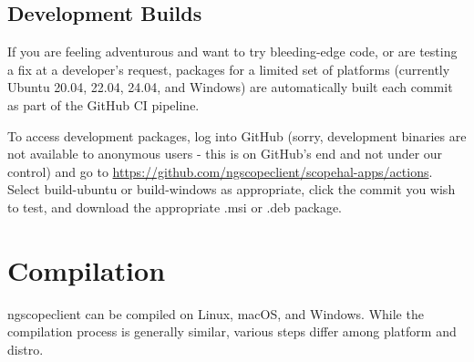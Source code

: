 \subsection{Development Builds}

If you are feeling adventurous and want to try bleeding-edge code, or are testing a fix at a developer's request,
packages for a limited set of platforms (currently Ubuntu 20.04, 22.04, 24.04, and Windows) are automatically built
each commit as part of the GitHub CI pipeline.

To access development packages, log into GitHub (sorry, development binaries are not available to
anonymous users - this is on GitHub's end and not under our control) and go to
\url{https://github.com/ngscopeclient/scopehal-apps/actions}. Select build-ubuntu or build-windows as appropriate,
click the commit you wish to test, and download the appropriate .msi or .deb package.

\section{Compilation}

ngscopeclient can be compiled on Linux, macOS, and Windows. While the compilation process is generally similar, various
steps differ among platform and distro.

